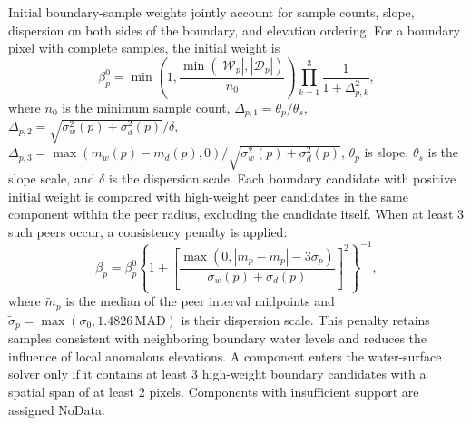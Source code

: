 \documentclass[authoryear,preprint,12pt]{elsarticle}
\begin{document}
Initial boundary-sample weights jointly account for sample counts, slope, dispersion on both sides of the boundary, and elevation ordering. For a boundary pixel with complete samples, the initial weight is
\begin{equation}\label{eq:ccdepth_weight}
 \beta_p^0=
 \min\!\left(1,\frac{\min(|\mathcal W_p|,|\mathcal D_p|)}{n_0}\right)
 \prod_{k=1}^{3}\frac{1}{1+\Delta_{p,k}^2},
\end{equation}
where \(n_0\) is the minimum sample count, \(\Delta_{p,1}=\theta_p/\theta_s\), \(\Delta_{p,2}=\sqrt{\sigma_w^2(p)+\sigma_d^2(p)}/\delta\), \(\Delta_{p,3}=\max(m_w(p)-m_d(p),0)/\sqrt{\sigma_w^2(p)+\sigma_d^2(p)}\), \(\theta_p\) is slope, \(\theta_s\) is the slope scale, and \(\delta\) is the dispersion scale. Each boundary candidate with positive initial weight is compared with high-weight peer candidates in the same component within the peer radius, excluding the candidate itself. When at least 3 such peers occur, a consistency penalty is applied:
\begin{equation}\label{eq:ccdepth_peer}
 \beta_p=\beta_p^0\left\{1+\left[\frac{\max(0,|m_p-\tilde m_p|-3\tilde\sigma_p)}{\sigma_w(p)+\sigma_d(p)}\right]^2\right\}^{-1},
\end{equation}
where \(\tilde m_p\) is the median of the peer interval midpoints and \(\tilde\sigma_p=\max(\sigma_0,1.4826\,\mathrm{MAD})\) is their dispersion scale. This penalty retains samples consistent with neighboring boundary water levels and reduces the influence of local anomalous elevations. A component enters the water-surface solver only if it contains at least 3 high-weight boundary candidates with a spatial span of at least 2 pixels. Components with insufficient support are assigned NoData.
\end{document}
